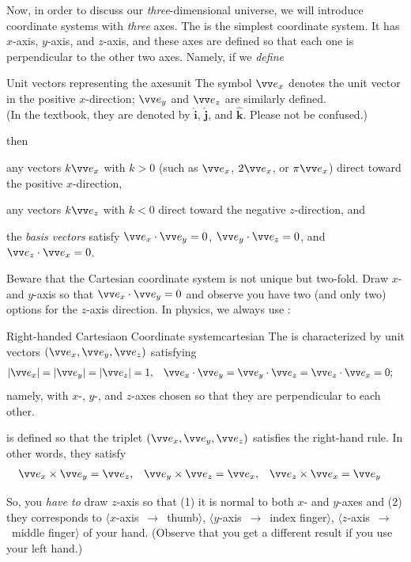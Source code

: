 \documentclass[11pt,pdfa,lastpage]{MishoNote}
\begin{document}
Now, in order to discuss our \emph{three}-dimensional universe, we will introduce coordinate systems with \emph{three} axes.
The  is the simplest coordinate system. It has ${x}$-axis, ${y}$-axis, and ${z}$-axis, and these axes are defined so that each one is perpendicular to the other two axes.
Namely, if we \emph{define}
\begin{definition}{Unit vectors representing the axes}{unit}
  The symbol $\vvex$ denotes the unit vector in the positive $x$-direction; $\vvey$ and $\vvez$ are similarly defined.\\[.5em]
  (In the textbook, they are denoted by $\hat{\mathbfup{i}}$, $\hat{\mathbfup{j}}$, and $\hat{\mathbfup{k}}$. Please not be confused.)
\end{definition}
then
\begin{miniitemize}
  \item any vectors $k\vvex$ with $k>0$ (such as $\vvex$, $2\vvex$, or $\pi\vvex$) direct toward the positive $x$-direction,
  \item any vectors $k\vvez$ with $k<0$ direct toward the negative $z$-direction, and
  \item the \emph{basis vectors} satisfy $\vvex\cdot\vvey=0$, $\vvey\cdot\vvez=0$, and $\vvez\cdot\vvex=0$.
\end{miniitemize}
Beware that the Cartesian coordinate system is not unique but two-fold. Draw $x$- and $y$-axis so that $\vvex\cdot\vvey=0$ and observe you have two (and only two) options for the $z$-axis direction.
In physics, we always use :
\begin{definition}{Right-handed Cartesiaon Coordinate system}{cartesian}
  The  is characterized by unit vectors $(\vvex,\vvey,\vvez)$ satisfying
  \begin{align}
    &|\vvex|=|\vvey|=|\vvez|=1,&
    &\vvex\cdot\vvey=\vvey\cdot\vvez=\vvez\cdot\vvex=0;
  \end{align}
  namely, with $x$-, $y$-, and $z$-axes chosen so that they are perpendicular to each other.

  is defined so that the triplet $(\vvex,\vvey,\vvez)$ satisfies the right-hand rule. In other words, they satisfy
  \begin{align}
    &\vvex\times\vvey=\vvez,
    &&\vvey\times\vvez=\vvex,
    &&\vvez\times\vvex=\vvey
  \end{align}
\end{definition}
So, you \emph{have to} draw $z$-axis so that (1) it is normal to both $x$- and $y$-axes and (2) they corresponds to
 $\langle x$-axis\ $\to$\ thumb$\rangle$,
 $\langle y$-axis\ $\to$\ index finger$\rangle$,
 $\langle z$-axis\ $\to$\ middle finger$\rangle$ of your  hand.
(Observe that you get a different result if you use your left hand.)
\end{document}
